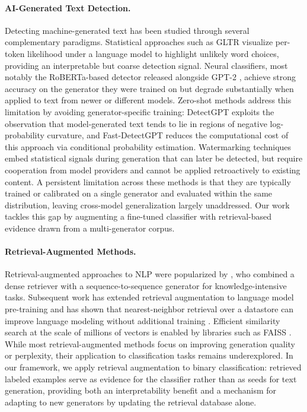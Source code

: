 \documentclass[letterpaper]{article} %
\begin{document}
\paragraph{AI-Generated Text Detection.}
Detecting machine-generated text has been studied through several complementary paradigms. Statistical approaches such as GLTR \cite{gehrmann2019gltr} visualize per-token likelihood under a language model to highlight unlikely word choices, providing an interpretable but coarse detection signal. Neural classifiers, most notably the RoBERTa-based detector released alongside GPT-2 \cite{solaiman2019release}, achieve strong accuracy on the generator they were trained on but degrade substantially when applied to text from newer or different models. Zero-shot methods address this limitation by avoiding generator-specific training: DetectGPT \cite{mitchell2023detectgpt} exploits the observation that model-generated text tends to lie in regions of negative log-probability curvature, and Fast-DetectGPT \cite{bao2024fastdetectgpt} reduces the computational cost of this approach via conditional probability estimation. Watermarking techniques \cite{kirchenbauer2023watermark} embed statistical signals during generation that can later be detected, but require cooperation from model providers and cannot be applied retroactively to existing content. A persistent limitation across these methods is that they are typically trained or calibrated on a single generator and evaluated within the same distribution, leaving cross-model generalization largely unaddressed. Our work tackles this gap by augmenting a fine-tuned classifier with retrieval-based evidence drawn from a multi-generator corpus.

\paragraph{Retrieval-Augmented Methods.}
Retrieval-augmented approaches to NLP were popularized by \citet{lewis2020rag}, who combined a dense retriever with a sequence-to-sequence generator for knowledge-intensive tasks. Subsequent work has extended retrieval augmentation to language model pre-training \cite{guu2020realm} and has shown that nearest-neighbor retrieval over a datastore can improve language modeling without additional training \cite{khandelwal2020knnlm}. Efficient similarity search at the scale of millions of vectors is enabled by libraries such as FAISS \cite{johnson2019faiss}. While most retrieval-augmented methods focus on improving generation quality or perplexity, their application to classification tasks remains underexplored. In our framework, we apply retrieval augmentation to binary classification: retrieved labeled examples serve as evidence for the classifier rather than as seeds for text generation, providing both an interpretability benefit and a mechanism for adapting to new generators by updating the retrieval database alone.
\end{document}
